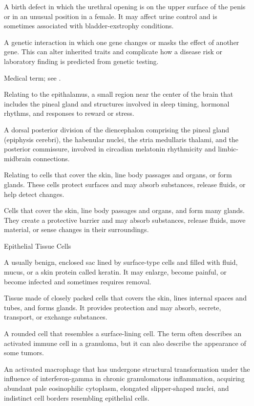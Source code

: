  A birth defect in which the urethral opening is on the upper surface of the penis or in an unusual position in a female. It may affect urine control and is sometimes associated with bladder-exstrophy conditions.

 A genetic interaction in which one gene changes or masks the effect of another gene. This can alter inherited traits and complicate how a disease risk or laboratory finding is predicted from genetic testing.

 Medical term; see .

 Relating to the epithalamus, a small region near the center of the brain that includes the pineal gland and structures involved in sleep timing, hormonal rhythms, and responses to reward or stress.

 A dorsal posterior division of the diencephalon comprising the pineal gland (epiphysis cerebri), the habenular nuclei, the stria medullaris thalami, and the posterior commissure, involved in circadian melatonin rhythmicity and limbic-midbrain connections.

 Relating to cells that cover the skin, line body passages and organs, or form glands. These cells protect surfaces and may absorb substances, release fluids, or help detect changes.

 Cells that cover the skin, line body passages and organs, and form many glands. They create a protective barrier and may absorb substances, release fluids, move material, or sense changes in their surroundings.

\synonyms
Epithelial Tissue Cells

 A usually benign, enclosed sac lined by surface-type cells and filled with fluid, mucus, or a skin protein called keratin. It may enlarge, become painful, or become infected and sometimes requires removal.

 Tissue made of closely packed cells that covers the skin, lines internal spaces and tubes, and forms glands. It provides protection and may absorb, secrete, transport, or exchange substances.

 A rounded cell that resembles a surface-lining cell. The term often describes an activated immune cell in a granuloma, but it can also describe the appearance of some tumors.

 An activated macrophage that has undergone structural transformation under the influence of interferon-gamma in chronic granulomatous inflammation, acquiring abundant pale eosinophilic cytoplasm, elongated slipper-shaped nuclei, and indistinct cell borders resembling epithelial cells.

